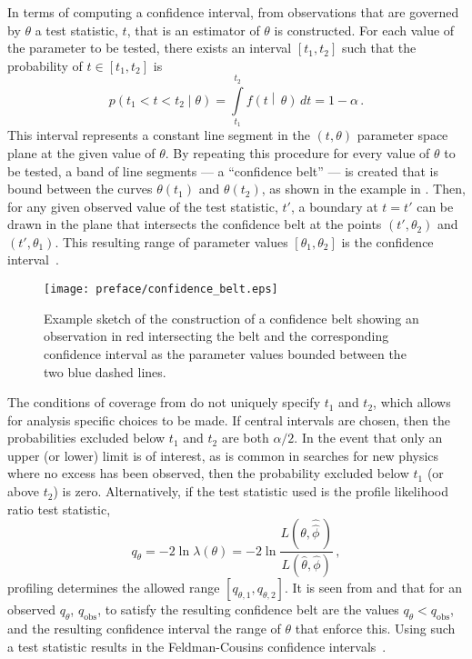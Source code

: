 In terms of computing a confidence interval, from observations that are governed by $\theta$ a test statistic, $t$, that is an estimator of $\theta$ is constructed.
For each value of the parameter to be tested, there exists an interval $\left[t_{1}, t_{2}\right]$ such that the probability of $t \in \left[t_{1}, t_{2}\right]$ is
\begin{equation}
 p\left(t_{1} < t < t_{2}\middle|\theta\right) = \int\limits_{t_{1}}^{t_{2}} f\left(t\middle|\,\theta\right)\,dt = 1-\alpha\,.
 \label{eq:confidence_interval_coverage}
\end{equation}
This interval represents a constant line segment in the $\left(t, \theta\right)$ parameter space plane at the given value of $\theta$.
By repeating this procedure for every value of $\theta$ to be tested, a band of line segments --- a ``confidence belt'' --- is created that is bound between the curves $\theta\left(t_{1}\right)$ and $\theta\left(t_{2}\right)$, as shown in the example in .
Then, for any given observed value of the test statistic, $t'$, a boundary at $t = t'$ can be drawn in the plane that intersects the confidence belt at the points $\left(t', \theta_{2}\right)$ and $\left(t', \theta_{1}\right)$.
This resulting range of parameter values $\left[\theta_{1}, \theta_{2}\right]$ is the confidence interval~\cite{Cranmer:2015nia,PDG2018:Ch39}.

\begin{figure}[htbp]
 \centering
 \texttt{[image: preface/confidence\_belt.eps]}
 \caption[Neyman construction of a confidence interval using a confidence belt.]{%
  Example sketch of the construction of a confidence belt showing an observation in red intersecting the belt and the corresponding confidence interval as the parameter values bounded between the two blue dashed lines.}\label{fig:confidence_belt}
\end{figure}

The conditions of coverage from  do not uniquely specify $t_{1}$ and $t_{2}$, which allows for analysis specific choices to be made.
If central intervals are chosen, then the probabilities excluded below $t_{1}$ and $t_{2}$ are both $\alpha/2$.
In the event that only an upper (or lower) limit is of interest, as is common in searches for new physics where no excess has been observed, then the probability excluded below $t_{1}$ (or above $t_{2}$) is zero.
Alternatively, if the test statistic used is the profile likelihood ratio test statistic,
\[
 q_{\theta} = -2 \ln\lambda\left(\theta\right) = -2 \ln\frac{L\left(\theta, \hat{\hat{\phi}}\,\right)}{L\left(\hat{\theta},\hat{\phi}\right)}\,,
\]
profiling determines the allowed range $\left[q_{\theta, 1}, q_{\theta, 2}\right]$.
It is seen from  and  that for an observed $q_{\theta}$, $q_{\mathrm{obs}}$, to satisfy  the resulting confidence belt are the values $q_{\theta} < q_{\mathrm{obs}}$, and the resulting confidence interval the range of $\theta$ that enforce this.
Using such a test statistic results in the Feldman-Cousins confidence intervals~\cite{Feldman:1997qc}.

